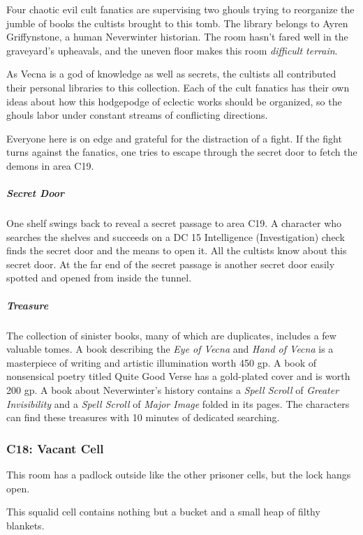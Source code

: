 \documentclass[10pt,a4paper,twoside,bg=print,twocolumn,openany,nodeprecatedcode]{dndbook}
\begin{document}
Four chaotic evil cult fanatics are supervising two ghouls trying to reorganize the jumble of books the cultists brought to this tomb. The library belongs to Ayren Griffynstone, a human Neverwinter historian. The room hasn't fared well in the graveyard's upheavals, and the uneven floor makes this room \textit{difficult terrain}.

As Vecna is a god of knowledge as well as secrets, the cultists all contributed their personal libraries to this collection. Each of the cult fanatics has their own ideas about how this hodgepodge of eclectic works should be organized, so the ghouls labor under constant streams of conflicting directions.

Everyone here is on edge and grateful for the distraction of a fight. If the fight turns against the fanatics, one tries to escape through the secret door to fetch the demons in area C19.

\subparagraph{Secret Door}
One shelf swings back to reveal a secret passage to area C19. A character who searches the shelves and succeeds on a DC 15 Intelligence (Investigation) check finds the secret door and the means to open it. All the cultists know about this secret door. At the far end of the secret passage is another secret door easily spotted and opened from inside the tunnel.

\subparagraph{Treasure}
The collection of sinister books, many of which are duplicates, includes a few valuable tomes. A book describing the \textit{Eye of Vecna} and \textit{Hand of Vecna} is a masterpiece of writing and artistic illumination worth 450 gp. A book of nonsensical poetry titled Quite Good Verse has a gold-plated cover and is worth 200 gp. A book about Neverwinter's history contains a \textit{Spell Scroll} of \textit{Greater Invisibility} and a \textit{Spell Scroll} of \textit{Major Image} folded in its pages. The characters can find these treasures with 10 minutes of dedicated searching.

\subsubsection{C18: Vacant Cell}
This room has a padlock outside like the other prisoner cells, but the lock hangs open.

\begin{DndReadAloud}{}
This squalid cell contains nothing but a bucket and a small heap of filthy blankets.

\end{DndReadAloud}
\end{document}
